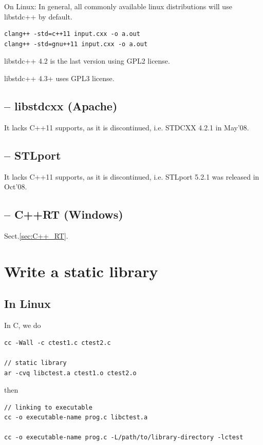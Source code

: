 On Linux: In general, all commonly available linux distributions will use
libstdc++ by default.

\begin{verbatim}
clang++ -std=c++11 input.cxx -o a.out
clang++ -std=gnu++11 input.cxx -o a.out
\end{verbatim}

libstdc++ 4.2 is the last version using GPL2 license.

libstdc++ 4.3+ uses GPL3 license.

\subsection{-- libstdcxx (Apache)}
\label{sec:libstdcxx}

It lacks C++11 supports, as it is discontinued, i.e. STDCXX 4.2.1 in May'08.

\subsection{-- STLport}

It lacks C++11 supports, as it is discontinued, i.e.
STLport 5.2.1 was released in Oct'08.

\subsection{-- C++RT (Windows)}

Sect.\ref{sec:C++_RT}.

\section{Write a static library}

\subsection{In Linux}

In C, we do
\begin{verbatim}
cc -Wall -c ctest1.c ctest2.c 

// static library
ar -cvq libctest.a ctest1.o ctest2.o

\end{verbatim}
then
\begin{verbatim}
// linking to executable
cc -o executable-name prog.c libctest.a

cc -o executable-name prog.c -L/path/to/library-directory -lctest
\end{verbatim}

